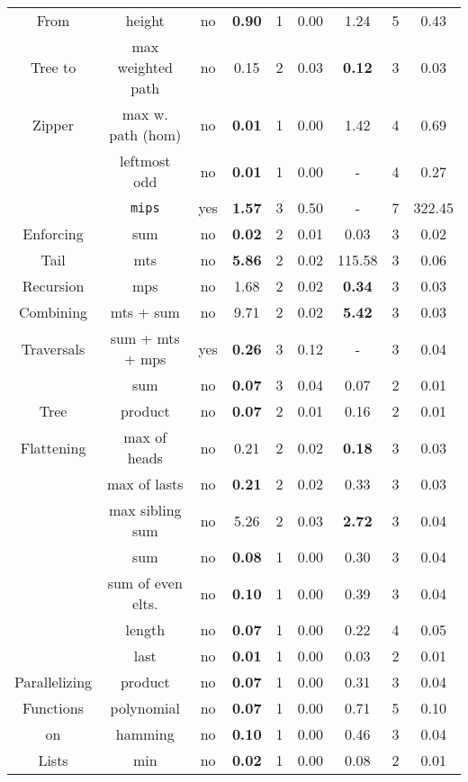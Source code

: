 \begin{table}
{\begin{tabular}[h]{|c|c|c|c|c|c||c|c|c|}
			From  & height & no & {\bfseries 0.90} & 1 & 0.00 & 1.24 & 5 & 0.43\\ 
			Tree to & max weighted path & no & 0.15 & 2 & 0.03 & {\bfseries 0.12} & 3 & 0.03\\ 
			Zipper & max w. path (hom) & no & {\bfseries 0.01} & 1 & 0.00 & 1.42 & 4 & 0.69\\ 
			 & leftmost odd & no & {\bfseries 0.01} & 1 & 0.00 & - & 4 & 0.27\\ 
			 & {\tt mips} & yes & {\bfseries 1.57} & 3 & 0.50 & - & 7 & 322.45\\ 
			\hline
			Enforcing & sum & no & {\bfseries 0.02} & 2 & 0.01 & 0.03 & 3 & 0.02\\ 
			Tail & mts & no & {\bfseries 5.86} & 2 & 0.02 & 115.58 & 3 & 0.06\\ 
			Recursion & mps & no & 1.68 & 2 & 0.02 & {\bfseries 0.34} & 3 & 0.03\\ 
			\hline
			Combining & mts + sum & no & 9.71 & 2 & 0.02 & {\bfseries 5.42} & 3 & 0.03\\ 
			Traversals & sum + mts + mps & yes & {\bfseries 0.26} & 3 & 0.12 & - & 3 & 0.04\\ 
			\hline
			 & sum & no & {\bfseries 0.07} & 3 & 0.04 & 0.07 & 2 & 0.01\\ 
			Tree & product & no & {\bfseries 0.07} & 2 & 0.01 & 0.16 & 2 & 0.01\\ 
			Flattening & max of heads & no & 0.21 & 2 & 0.02 & {\bfseries 0.18} & 3 & 0.03\\ 
			 & max of lasts & no & {\bfseries 0.21} & 2 & 0.02 & 0.33 & 3 & 0.03\\ 
			 & max sibling sum & no & 5.26 & 2 & 0.03 & {\bfseries 2.72} & 3 & 0.04\\ 
			\hline
			 & sum & no & {\bfseries 0.08} & 1 & 0.00 & 0.30 & 3 & 0.04\\ 
			 & sum of even elts. & no & {\bfseries 0.10} & 1 & 0.00 & 0.39 & 3 & 0.04\\ 
			 & length & no & {\bfseries 0.07} & 1 & 0.00 & 0.22 & 4 & 0.05\\ 
			 & last & no & {\bfseries 0.01} & 1 & 0.00 & 0.03 & 2 & 0.01\\ 
			Parallelizing & product & no & {\bfseries 0.07} & 1 & 0.00 & 0.31 & 3 & 0.04\\ 
			Functions & polynomial & no & {\bfseries 0.07} & 1 & 0.00 & 0.71 & 5 & 0.10\\ 
			on & hamming & no & {\bfseries 0.10} & 1 & 0.00 & 0.46 & 3 & 0.04\\ 
			Lists & min & no & {\bfseries 0.02} & 1 & 0.00 & 0.08 & 2 & 0.01\\ 

\end{tabular}}
\end{table}
